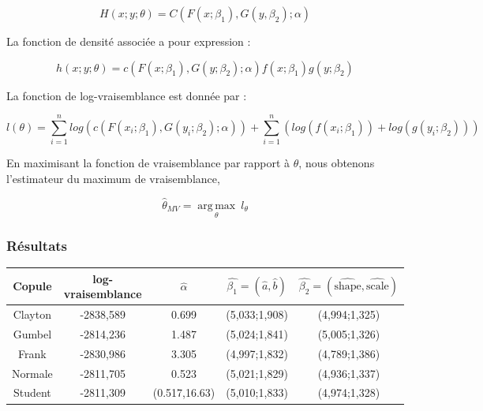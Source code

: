 \begin{equation*}
H(x;y;\theta) = C(F(x;\beta_1),G(y,\beta_2);\alpha)
\end{equation*}

\begin{flushleft}
La fonction de densité associée a pour expression :
\end{flushleft}
\begin{equation*}
h(x;y;\theta) = c(F(x;\beta_1),G(y;\beta_2);\alpha)f(x;\beta_1)g(y;\beta_2)
\end{equation*}

\begin{flushleft}
La fonction de log-vraisemblance est donnée par :
\end{flushleft}
\begin{equation*}
l(\theta) = \sum_{i=1}^n log(c(F(x_i;\beta_1),G(y_i;\beta_2);\alpha)) + \sum_{i=1}^n (log(f(x_i;\beta_1)) + log(g(y_i;\beta_2)))
\end{equation*}

En maximisant la fonction de vraisemblance par rapport à $\theta$, nous obtenons l'estimateur du maximum de vraisemblance,

\begin{equation*}
\hat{\theta}_{MV} = \underset{\theta}{\operatorname{arg\,max}} ~ l_{\theta}
\end{equation*} 

\subsubsection{Résultats}

\begin{center}
\begin{tabular}{|c|c|c|c|c|}
\hline 
Copule & log-vraisemblance & $\hat{\alpha}$ & $\hat{\beta_1} = (\widehat{a},\widehat{b})$ & $\hat{\beta_2} = (\widehat{\text{shape}},\widehat{\text{scale}})$ \\
\hline
Clayton & -2838,589 & 0.699 & (5,033;1,908) & (4,994;1,325) \\
\hline
Gumbel & -2814,236 & 1.487 & (5,024;1,841) & (5,005;1,326) \\
\hline
Frank & -2830,986 & 3.305 & (4,997;1,832) & (4,789;1,386) \\
\hline
Normale & -2811,705 & 0.523 & (5,021;1,829) & (4,936;1,337) \\
\hline
Student & -2811,309 & (0.517,16.63)  & (5,010;1,833) & (4,974;1,328) \\
\hline
\end{tabular}
\end{center}

